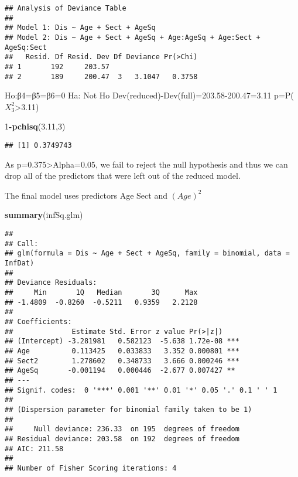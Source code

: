 \documentclass[]{article}
\newenvironment{Shaded}{\begin{snugshade}}{\end{snugshade}}
\newcommand{\KeywordTok}[1]{\textcolor[rgb]{0.13,0.29,0.53}{\textbf{#1}}}
\newcommand{\DecValTok}[1]{\textcolor[rgb]{0.00,0.00,0.81}{#1}}
\newcommand{\FloatTok}[1]{\textcolor[rgb]{0.00,0.00,0.81}{#1}}
\newcommand{\OperatorTok}[1]{\textcolor[rgb]{0.81,0.36,0.00}{\textbf{#1}}}
\newcommand{\NormalTok}[1]{#1}
\begin{document}
\begin{verbatim}
## Analysis of Deviance Table
## 
## Model 1: Dis ~ Age + Sect + AgeSq
## Model 2: Dis ~ Age + Sect + AgeSq + Age:AgeSq + Age:Sect + AgeSq:Sect
##   Resid. Df Resid. Dev Df Deviance Pr(>Chi)
## 1       192     203.57                     
## 2       189     200.47  3   3.1047   0.3758
\end{verbatim}

Ho:β4=β5=β6=0 Ha: Not Ho Dev(reduced)-Dev(full)=203.58-200.47=3.11
p=P(\(X^2_3\)\textgreater{}3.11)

\begin{Shaded}
\begin{Highlighting}[]
\DecValTok{1}\OperatorTok{-}\KeywordTok{pchisq}\NormalTok{(}\FloatTok{3.11}\NormalTok{,}\DecValTok{3}\NormalTok{)}
\end{Highlighting}
\end{Shaded}

\begin{verbatim}
## [1] 0.3749743
\end{verbatim}

As p=0.375\textgreater{}Alpha=0.05, we fail to reject the null
hypothesis and thus we can drop all of the predictors that were left out
of the reduced model.

The final model uses predictors Age Sect and \((Age)^2\)

\begin{Shaded}
\begin{Highlighting}[]
\KeywordTok{summary}\NormalTok{(infSq.glm)}
\end{Highlighting}
\end{Shaded}

\begin{verbatim}
## 
## Call:
## glm(formula = Dis ~ Age + Sect + AgeSq, family = binomial, data = InfDat)
## 
## Deviance Residuals: 
##     Min       1Q   Median       3Q      Max  
## -1.4809  -0.8260  -0.5211   0.9359   2.2128  
## 
## Coefficients:
##              Estimate Std. Error z value Pr(>|z|)    
## (Intercept) -3.281981   0.582123  -5.638 1.72e-08 ***
## Age          0.113425   0.033833   3.352 0.000801 ***
## Sect2        1.278602   0.348733   3.666 0.000246 ***
## AgeSq       -0.001194   0.000446  -2.677 0.007427 ** 
## ---
## Signif. codes:  0 '***' 0.001 '**' 0.01 '*' 0.05 '.' 0.1 ' ' 1
## 
## (Dispersion parameter for binomial family taken to be 1)
## 
##     Null deviance: 236.33  on 195  degrees of freedom
## Residual deviance: 203.58  on 192  degrees of freedom
## AIC: 211.58
## 
## Number of Fisher Scoring iterations: 4
\end{verbatim}
\end{document}
